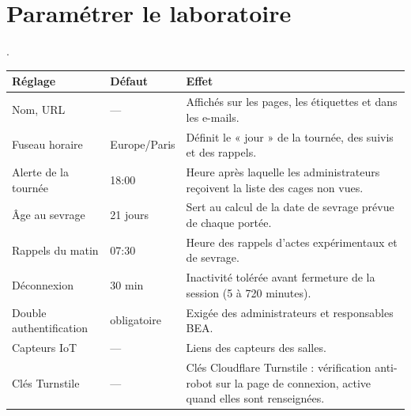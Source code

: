 \documentclass[11pt,a4paper]{article}
\begin{document}
\section{Paramétrer le laboratoire}
.
\begin{center}
\begin{tabularx}{\textwidth}{@{}lp{2.5cm}X@{}}
\toprule
\textbf{Réglage} & \textbf{Défaut} & \textbf{Effet}\\
\midrule
Nom, URL & --- & Affichés sur les pages, les étiquettes et dans les e-mails.\\
Fuseau horaire & Europe/Paris & Définit le « jour » de la tournée, des suivis et des rappels.\\
Alerte de la tournée & 18:00 & Heure après laquelle les administrateurs reçoivent la liste des cages non vues.\\
Âge au sevrage & 21 jours & Sert au calcul de la date de sevrage prévue de chaque portée.\\
Rappels du matin & 07:30 & Heure des rappels d'actes expérimentaux et de sevrage.\\
Déconnexion & 30 min & Inactivité tolérée avant fermeture de la session (5 à 720 minutes).\\
Double authentification & obligatoire & Exigée des administrateurs et responsables BEA.\\
Capteurs IoT & --- & Liens des capteurs des salles.\\
Clés Turnstile & --- & Clés Cloudflare Turnstile : vérification anti-robot sur la page de connexion, active quand elles sont renseignées.\\
\bottomrule
\end{tabularx}
\end{center}
\end{document}
